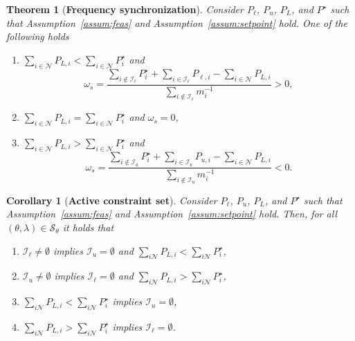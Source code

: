 \documentclass[twocolumn,twoside,journal]{IEEEtran}
\newcommand{\mc}{\mathcal}
\newtheorem{theorem}{Theorem}
\newtheorem{corollary}{Corollary}
\begin{document}
\begin{theorem}[\textbf{Frequency synchronization}]\label{th:syncfreq}
    Consider $P_\ell$, $P_u$, $P_L$, and $P^\star$ such that Assumption~\ref{assum:feas} and Assumption~\ref{assum:setpoint} hold. One of the following holds
    \begin{enumerate}[label=(\roman*)]
        \item $\sum_{i \in \mc N}  P_{L,i} < \sum_{i \in \mc N} P^\star_i$ and \[\omega_s\!=\!\frac{\sum_{i \notin \mathcal{I}_\ell} P_i^\star+\sum_{i \in \mathcal{I}_\ell} P_{\ell, i}-\sum_{i \in \mathcal{N}} P_{L, i}}{\sum_{i \notin \mathcal{I}_\ell} m_i^{-1}} > 0,\] \label{th:syncfreq:lower}
        \item   $\sum_{i \in \mc N}  P_{L,i} = \sum_{i \in \mc N} P^\star_i$ and $\omega_s=0$, \label{th:syncfreq:equal}
        \item $\sum_{i \in \mc N}  P_{L,i} > \sum_{i \in \mc N} P^\star_i$ and 
        \[\omega_s\!=\!\frac{\sum_{i \notin \mathcal{I}_u} P_i^\star+\sum_{i \in \mathcal{I}_u} P_{u, i}-\sum_{i \in \mathcal{N}} P_{L, i}}{\sum_{i \notin \mathcal{I}_u} m_i^{-1}} < 0.\] \label{th:syncfreq:higher}
    \end{enumerate}
\end{theorem}

\begin{corollary}[\textbf{Active constraint set}]\label{cor:activesets}
    Consider $P_\ell$, $P_u$, $P_L$, and $P^\star$ such that Assumption~\ref{assum:feas} and Assumption~\ref{assum:setpoint} hold.  Then, for all $(\theta,\lambda) \in \mathcal{S}_{\theta}$ it holds that 
    \begin{enumerate}[label=(\roman*)]
    \item $\mathcal{I}_{\ell} \neq \emptyset$ implies $\mathcal{I}_{u} = \emptyset$ and $\sum_{i \mc N} P_{L,i} < \sum_{i \mc N} P^\star_i$, \label{cor:activesets:ellu}
    \item $\mathcal{I}_{u} \neq \emptyset$ implies $\mathcal{I}_{\ell} = \emptyset$ and $\sum_{i \mc N} P_{L,i} > \sum_{i \mc N} P^\star_i$, \label{cor:activesets:uell}
    \item $\sum_{i \mc N}  P_{L,i} < \sum_{i \mc N} P^\star_i$ implies $\mathcal{I}_{u} = \emptyset$, \label{cor:activesets:lowload}
    \item $\sum_{i \mc N} P_{L,i} > \sum_{i \mc N} P^\star_i$ implies $\mathcal{I}_{\ell} = \emptyset$. \label{cor:activesets:highload}
    \end{enumerate}
\end{corollary}
\end{document}
